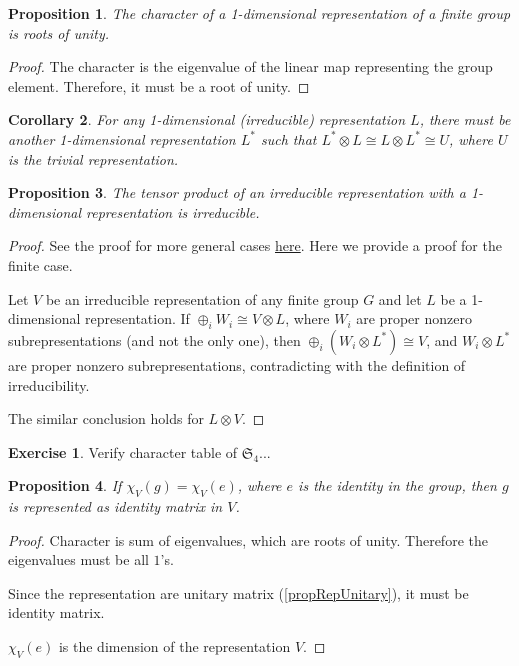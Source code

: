\documentclass[12pt, letterpaper]{article}
\newtheorem{prop}{Proposition}[section]
\newtheorem{cor}[prop]{Corollary}
\theoremstyle{definition}
\theoremstyle{remark}
\theoremstyle{definition}
\newtheorem{exe}{Exercise}[section]
\theoremstyle{plain}
\numberwithin{equation}{section}
\begin{document}
	\begin{prop}
		The character of a 1-dimensional representation of a finite group is roots of unity.
	\end{prop}
	\begin{proof}
		The character is the eigenvalue of the linear map representing the group element.
		Therefore, it must be a root of unity.
	\end{proof}
	\begin{cor}
		For any 1-dimensional (irreducible) representation $L$,
		there must be another 1-dimensional representation $L^*$ such that
		$L^*\otimes L \cong L\otimes L^* \cong U$,
		where $U$ is the trivial representation.
	\end{cor}
	\begin{prop}
		The tensor product of an irreducible representation with a 1-dimensional representation is irreducible.
	\end{prop}
	\begin{proof}
		See the proof for more general cases \href {https://math.stackexchange.com/questions/745262/why-does-the-tensor-product-of-an-irreducible-representation-with-the-sign-repre}{here}. Here we provide a proof for the finite case.
		
		Let $V$ be an irreducible representation of any finite group $G$ and let $L$ be a 1-dimensional representation.
		If $\oplus_i W_i \cong V \otimes L$, where $W_i$ are proper nonzero subrepresentations (and not the only one),
		then $\oplus_i (W_i\otimes L^*)\cong V$, and $W_i\otimes L^*$ are proper nonzero subrepresentations,
		contradicting with the definition of irreducibility.
		
		The similar conclusion holds for $L \otimes V$.
	\end{proof}
	\begin{exe}
		Verify character table of $\mathfrak{S}_4$...
	\end{exe}
	\begin{prop}
		If $\chi_V(g)=\chi_V(e)$, where $e$ is the identity in the group,
		then $g$ is represented as identity matrix in $V$.
	\end{prop}
	\begin{proof}
		Character is sum of eigenvalues, which are roots of unity.
		Therefore the eigenvalues must be all $1$'s.
		
		Since the representation are unitary matrix (\ref{propRepUnitary}), it must be identity matrix.

		$\chi_V(e)$ is the dimension of the representation $V$.
	\end{proof}
\end{document}
